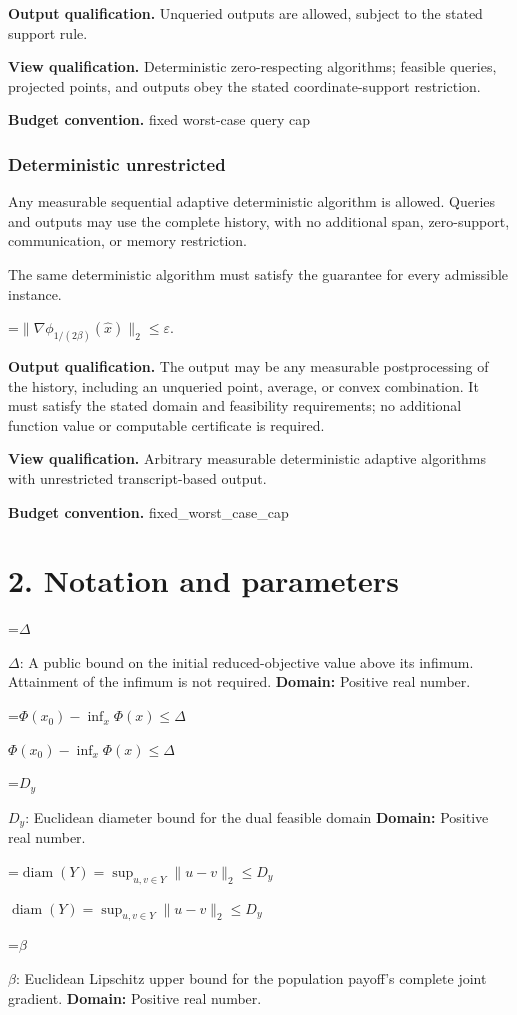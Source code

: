 \documentclass[10pt,a4paper]{article}
\newcommand{\AtlasMath}[1]{\par\begingroup\centering\setbox0=\hbox{$\displaystyle #1$}\ifdim\wd0>1.4\linewidth\typeout{ATLAS WIDE FORMULA: \the\wd0}\fi\ifdim\wd0>\linewidth\resizebox{\linewidth}{!}{\box0}\else\box0\fi\par\endgroup}
\newcommand{\AtlasInlineMath}[1]{\begingroup\setbox0=\hbox{$#1$}\ifdim\wd0>.4\linewidth\endgroup\AtlasMath{#1}\else\endgroup$#1$\fi}
\begin{document}
\textbf{Output qualification.} Unqueried outputs are allowed, subject to the stated support rule.

\textbf{View qualification.} Deterministic zero-respecting algorithms; feasible queries, projected points, and outputs obey the stated coordinate-support restriction.

\textbf{Budget convention.} fixed worst-case query cap

\subsubsection{Deterministic unrestricted}
Any measurable sequential adaptive deterministic algorithm is allowed. Queries and outputs may use the complete history, with no additional span, zero-support, communication, or memory restriction.

The same deterministic algorithm must satisfy the guarantee for every admissible instance.


\AtlasMath{\|\nabla\phi_{1/(2\beta)}(\widehat{x})\|_2\le\varepsilon.}


\textbf{Output qualification.} The output may be any measurable postprocessing of the history, including an unqueried point, average, or convex combination. It must satisfy the stated domain and feasibility requirements; no additional function value or computable certificate is required.

\textbf{View qualification.} Arbitrary measurable deterministic adaptive algorithms with unrestricted transcript-based output.

\textbf{Budget convention.} fixed\_worst\_case\_cap

\section{2. Notation and parameters}
\AtlasInlineMath{\Delta}: A public bound on the initial reduced-objective value above its infimum. Attainment of the infimum is not required. \textbf{Domain:} Positive real number.

\AtlasInlineMath{\Phi(x_0)-\inf_x\Phi(x)\le\Delta}

\AtlasInlineMath{D_y}: Euclidean diameter bound for the dual feasible domain \textbf{Domain:} Positive real number.

\AtlasInlineMath{\operatorname{diam}(Y)=\sup_{u,v\in Y}\|u-v\|_2\le D_y}

\AtlasInlineMath{\beta}: Euclidean Lipschitz upper bound for the population payoff's complete joint gradient. \textbf{Domain:} Positive real number.
\end{document}
